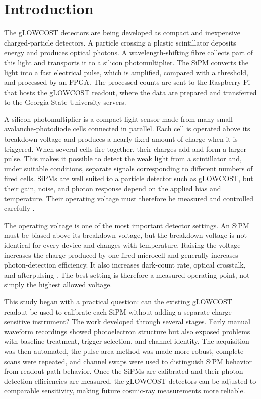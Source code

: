 \section{Introduction}

The gLOWCOST detectors are being developed as compact and inexpensive charged-particle detectors. A particle crossing a plastic scintillator deposits energy and produces optical photons. A wavelength-shifting fibre collects part of this light and transports it to a silicon photomultiplier. The SiPM converts the light into a fast electrical pulse, which is amplified, compared with a threshold, and processed by an FPGA. The processed counts are sent to the Raspberry Pi that hosts the gLOWCOST readout, where the data are prepared and transferred to the Georgia State University servers.

A silicon photomultiplier is a compact light sensor made from many small avalanche-photodiode cells connected in parallel. Each cell is operated above its breakdown voltage and produces a nearly fixed amount of charge when it is triggered. When several cells fire together, their charges add and form a larger pulse. This makes it possible to detect the weak light from a scintillator and, under suitable conditions, separate signals corresponding to different numbers of fired cells. SiPMs are well suited to a particle detector such as gLOWCOST, but their gain, noise, and photon response depend on the applied bias and temperature. Their operating voltage must therefore be measured and controlled carefully \cite{hamamatsuTechnical,klanner2019}.

The operating voltage is one of the most important detector settings. An SiPM must be biased above its breakdown voltage, but the breakdown voltage is not identical for every device and changes with temperature. Raising the voltage increases the charge produced by one fired microcell and generally increases photon-detection efficiency. It also increases dark-count rate, optical crosstalk, and afterpulsing \cite{klanner2019,hamamatsuTechnical}. The best setting is therefore a measured operating point, not simply the highest allowed voltage.

This study began with a practical question: can the existing gLOWCOST readout be used to calibrate each SiPM without adding a separate charge-sensitive instrument? The work developed through several stages. Early manual waveform recordings showed photoelectron structure but also exposed problems with baseline treatment, trigger selection, and channel identity. The acquisition was then automated, the pulse-area method was made more robust, complete scans were repeated, and channel swaps were used to distinguish SiPM behavior from readout-path behavior. Once the SiPMs are calibrated and their photon-detection efficiencies are measured, the gLOWCOST detectors can be adjusted to comparable sensitivity, making future cosmic-ray measurements more reliable.

